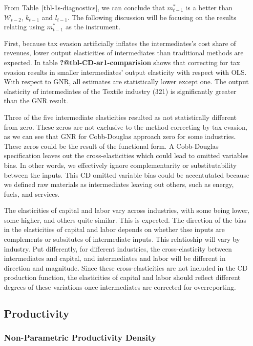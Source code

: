 \documentclass[
  12pt]{article}
\theoremstyle{definition}
\theoremstyle{remark}
\begin{document}
From Table~\ref{tbl-1s-diagnostics}, we can conclude that \(m^*_{t-1}\)
is a better than \(\mathcal{W}_{t-2}\), \(k_{t-1}\) and \(l_{t-1}\). The
following discussion will be focusing on the results relating using
\(m^*_{t-1}\) as the instrument.

First, because tax evasion artificially inflates the intermediates's
cost share of revenues, lower output elasticities of intermediates than
traditional methods are expected. In table
\textbf{?@tbl-CD-ar1-comparision} shows that correcting for tax evasion
results in smaller intermediates' output elasticity with respect with
OLS. With respect to GNR, all estimates are statistically lower except
one. The output elasticity of intermediates of the Textile industry
(321) is significantly greater than the GNR result.

Three of the five intermediate elasticities resulted as not
statistically different from zero. These zeros are not exclusive to the
method correcting by tax evasion, as we can see that GNR for
Cobb-Douglas approach zero for some industries. These zeros could be the
result of the functional form. A Cobb-Douglas specification leaves out
the cross-elasticities which could lead to omitted variables bias. In
other words, we effectively ignore complementarity or substitutability
between the inputs. This CD omitted variable bias could be accentutated
because we defined raw materials as intermediates leaving out others,
such as energy, fuels, and services.

The elasticities of capital and labor vary across industries, with some
being lower, some higher, and others quite similar. This is expected.
The direction of the bias in the elasticities of capital and labor
depends on whether thse inputs are complements or subsitutes of
intermediate inputs. This relatioship will vary by industry. Put
differently, for different industries, the cross-elasticity between
intermediates and capital, and intermediates and labor will be different
in direction and magnitude. Since these cross-elasticities are not
included in the CD production function, the elasticities of capital and
labor should reflect different degrees of these variations once
intermediates are corrected for overreporting.

\subsection{Productivity}\label{productivity}

\subsubsection{Non-Parametric Productivity
Density}\label{non-parametric-productivity-density}
\end{document}
